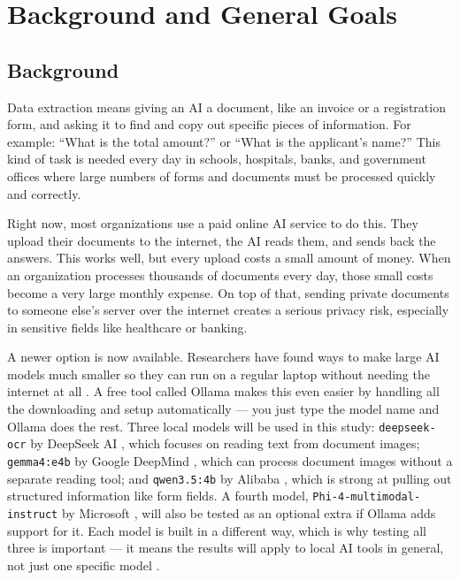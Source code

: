 \section{Background and General Goals}
\label{sec:background}

\subsection{Background}

Data extraction means giving an AI a document, like an invoice or a registration form, and asking it to find and copy out specific pieces of information. For example: ``What is the total amount?'' or ``What is the applicant's name?'' This kind of task is needed every day in schools, hospitals, banks, and government offices where large numbers of forms and documents must be processed quickly and correctly.

Right now, most organizations use a paid online AI service to do this. They upload their documents to the internet, the AI reads them, and sends back the answers. This works well, but every upload costs a small amount of money. When an organization processes thousands of documents every day, those small costs become a very large monthly expense. On top of that, sending private documents to someone else's server over the internet creates a serious privacy risk, especially in sensitive fields like healthcare or banking.

A newer option is now available. Researchers have found ways to make large AI models much smaller so they can run on a regular laptop without needing the internet at all \cite{dettmers2022llmint8, frantar2022gptq}. A free tool called Ollama \cite{ollama_2024} makes this even easier by handling all the downloading and setup automatically --- you just type the model name and Ollama does the rest. Three local models will be used in this study: \texttt{deepseek-ocr} by DeepSeek AI \cite{deepseek_ocr_2024}, which focuses on reading text from document images; \texttt{gemma4:e4b} by Google DeepMind \cite{gemma4_2026}, which can process document images without a separate reading tool; and \texttt{qwen3.5:4b} by Alibaba \cite{qwen3_2025}, which is strong at pulling out structured information like form fields. A fourth model, \texttt{Phi-4-multimodal-instruct} by Microsoft \cite{phi4mini_2025}, will also be tested as an optional extra if Ollama adds support for it. Each model is built in a different way, which is why testing all three is important --- it means the results will apply to local AI tools in general, not just one specific model \cite{gemma4_phi4_qwen3_2026}.

